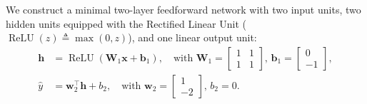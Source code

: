We construct a minimal two-layer feedforward network with two input units, two hidden units equipped with the Rectified Linear Unit ($\operatorname{ReLU}(z) \triangleq \max(0, z)$), and one linear output unit:
\begin{align}
\mathbf{h} &= \operatorname{ReLU}(\mathbf{W}_1 \mathbf{x} + \mathbf{b}_1), \quad \text{with } \mathbf{W}_1 = \begin{bmatrix} 1 & 1 \\ 1 & 1 \end{bmatrix}, \, \mathbf{b}_1 = \begin{bmatrix} 0 \\ -1 \end{bmatrix}, \label{eq:xor_hidden_forward} \\
\hat{y} &= \mathbf{w}_2^\top \mathbf{h} + b_2, \quad \text{with } \mathbf{w}_2 = \begin{bmatrix} 1 \\ -2 \end{bmatrix}, \, b_2 = 0. \label{eq:xor_output_forward}
\end{align}

